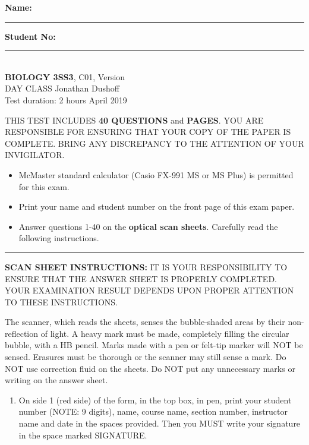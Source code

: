

\textbf{Name:} \rule{5cm}{1pt} \hfill \textbf{Student No:} \rule{5cm}{1pt} \\

\bigskip\noindent \hfill {\large {\bf BIOLOGY 3SS3}, C01,
	Version \testver
} \hspace*{\fill} \\
DAY CLASS  \hfill Jonathan Dushoff \\
Test duration: 2 hours \hfill April 2019

{\small

\medskip\noindent THIS TEST INCLUDES {\bf 40 QUESTIONS} and \textbf{\pageref{LastPage} PAGES}. YOU ARE RESPONSIBLE FOR ENSURING THAT YOUR COPY OF THE PAPER IS COMPLETE. BRING ANY DISCREPANCY TO THE ATTENTION OF YOUR INVIGILATOR. 

\begin{itemize}
\item McMaster standard calculator (Casio FX-991 MS or MS Plus) is permitted for this exam.
\item Print your name and student number on the front page of this exam paper.
\item Answer questions 1-40 on the \textbf{optical scan sheets}.  Carefully read the following instructions.
\end{itemize}
\hrule
\bigskip\textbf{SCAN SHEET INSTRUCTIONS:} 
IT IS YOUR RESPONSIBILITY TO ENSURE THAT THE ANSWER SHEET IS PROPERLY COMPLETED. YOUR EXAMINATION RESULT DEPENDS UPON PROPER ATTENTION TO THESE INSTRUCTIONS.

The scanner, which reads the sheets, senses the bubble-shaded areas by their non-reflection of light.  A heavy mark must be made, completely filling the circular bubble, with a HB pencil.  Marks made with a pen or felt-tip marker will NOT be sensed.  Erasures must be thorough or the scanner may still sense a mark.  Do NOT use correction fluid on the sheets.  Do NOT put any unnecessary marks or writing on the answer sheet.

\begin{enumerate}

\item On side 1 (red side) of the form, in the top box, in pen, print your student number (NOTE: 9 digits), name, course name, section number, instructor name and date in the spaces provided.  Then you MUST write your signature in the space marked SIGNATURE.


\end{enumerate}}
